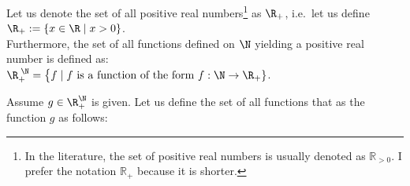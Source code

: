 Let us denote the set of all positive real numbers\footnote{
  In the literature, the set of positive real numbers is usually denoted as $\mathbb{R}_{>0}$.  I prefer the
  notation $\mathbb{R_+}$ because it is shorter.
}
as $\R_+$, i.e.~let us define 
\\[0.2cm]
\hspace*{1.3cm}
$\R_+ := \{ x \in \R \mid x > 0 \}$. 
\\[0.2cm]
Furthermore, the set of all functions defined on  $\N$ yielding a positive real number is defined
as: 
\\[0.2cm]
\hspace*{1.3cm} 
$\R_+^{\;\N} = \bigl\{ f \mid \mbox{$f$ is a function of the form $f: \N \rightarrow \R_+$} \}$. 

\begin{Definition}[$\Oh(g)$] 
Assume $g \in \R_+^{\N}$ is given.   Let us define the set of all functions that 
  as the function $g$ as follows: 
  \\[0.2cm]
  \hspace*{0.5cm} 
  \colorbox{red}{}
  \eox
\end{Definition}

